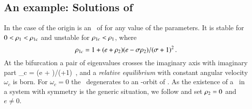 
\subsection{\label{s:CLEsols} An example: Solutions of \cLe}

In the case of {\cLe}  the origin  is an \eqv\ of
 for any value of the parameters. It is stable
for $0<\rho_1<\rho_{1c}$ and unstable for
$\rho_{1c}<\rho_1$, where
\[
	\rho_{1c} = 1 + {(e+\rho_2)(e-\sigma \rho_2)}/{(\sigma+1)^2}
\,.
\]
At the bifurcation a pair of eigenvalues crosses
the imaginary axis with imaginary part
\beq
	\omega_c = {\sigma (e + \ImrCLor)}/{(\sigma+1)}
\,,
and a \emph{relative equilibrium}  with constant
angular velocity $\omega_c$ is born. For $\omega_c =0$ the
\reqv\ degenerates to an -orbit of \eqva. As the
existence of a \reqv\ in a system with  symmetry is
the generic situation, we follow 
and set $\rho_2=0$ and $e \neq 0$.

